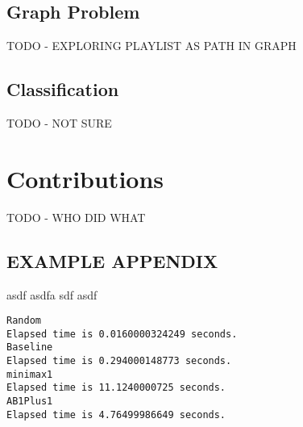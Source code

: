 \documentclass[10pt,journal,compsoc]{IEEEtran}
\begin{document}
\subsection{Graph Problem}
TODO - EXPLORING PLAYLIST AS PATH IN GRAPH

\subsection{Classification}
TODO - NOT SURE

\section{Contributions}
TODO - WHO DID WHAT

{}


\begin{appendices}
\section{EXAMPLE APPENDIX}
asdf asdfa sdf asdf\\

\lstset{
basicstyle=\small\ttfamily,
columns=flexible,
breaklines=true
}
\begin{lstlisting}
Random
Elapsed time is 0.0160000324249 seconds.
Baseline
Elapsed time is 0.294000148773 seconds.
minimax1
Elapsed time is 11.1240000725 seconds.
AB1Plus1
Elapsed time is 4.76499986649 seconds.
\end{lstlisting}
\end{appendices}

\end{document}
